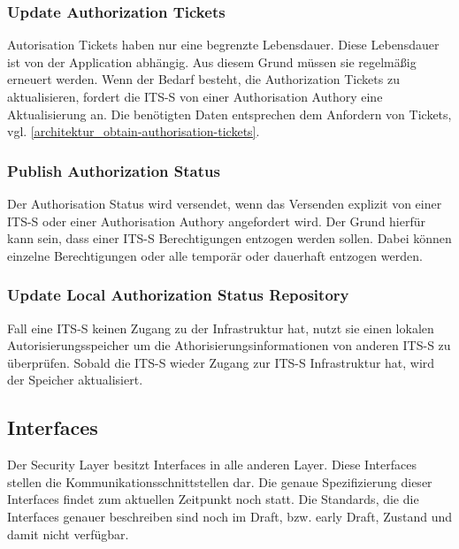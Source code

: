 \subsubsection{Update Authorization Tickets}
Autorisation Tickets haben nur eine begrenzte Lebensdauer. Diese Lebensdauer ist von der Application abhängig. Aus diesem Grund müssen sie regelmäßig erneuert werden. Wenn der Bedarf besteht, die Authorization Tickets zu aktualisieren, fordert die \ac{ITS-S} von einer Authorisation Authory eine Aktualisierung an. Die benötigten Daten entsprechen dem Anfordern von Tickets, vgl. \autoref{architektur_obtain-authorisation-tickets}.

\subsubsection{Publish Authorization Status}
Der Authorisation Status wird versendet, wenn das Versenden explizit von einer \ac{ITS-S} oder einer Authorisation Authory angefordert wird. Der Grund hierfür kann sein, dass einer \ac{ITS-S} Berechtigungen entzogen werden sollen. Dabei können einzelne Berechtigungen oder alle temporär oder dauerhaft entzogen werden.

\subsubsection{Update Local Authorization Status Repository}
Fall eine \ac{ITS-S} keinen Zugang zu der Infrastruktur hat, nutzt sie einen lokalen Autorisierungsspeicher um die Athorisierungsinformationen von anderen \ac{ITS-S} zu überprüfen. Sobald die \ac{ITS-S} wieder Zugang zur \ac{ITS-S} Infrastruktur hat, wird der Speicher aktualisiert.  

\subsection{Interfaces}
Der Security Layer besitzt Interfaces in alle anderen Layer. Diese Interfaces stellen die Kommunikationsschnittstellen dar. Die genaue Spezifizierung dieser Interfaces findet zum aktuellen Zeitpunkt noch statt. Die Standards, die die  Interfaces genauer beschreiben sind noch im  \glqq Draft\grqq , bzw. \glqq early Draft\grqq , Zustand und damit nicht verfügbar. 

